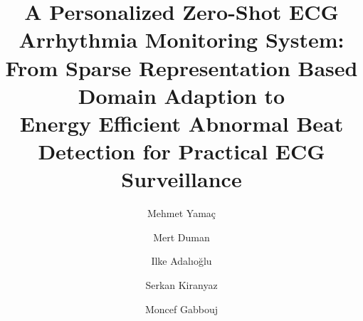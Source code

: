 \documentclass[journal,transmag]{IEEEtran}
\begin{document}
\title{A Personalized Zero-Shot ECG Arrhythmia Monitoring System: \\ From Sparse Representation Based Domain Adaption to \\ Energy Efficient Abnormal Beat Detection for Practical ECG Surveillance}





\author[1]{Mehmet Yama\c{c}}
\author[1]{Mert Duman}
\author[1]{Ilke Adalıoğlu}
\author[2]{Serkan Kiranyaz}
\author[1]{Moncef Gabbouj}





















\maketitle
\end{document}
